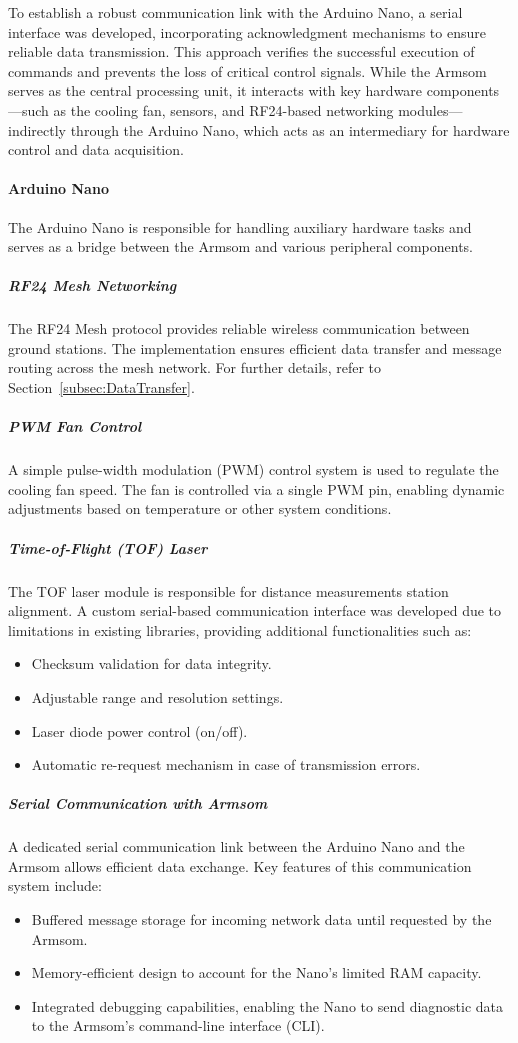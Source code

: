 To establish a robust communication link with the Arduino Nano, a serial interface was developed, incorporating acknowledgment mechanisms to ensure reliable data transmission. This approach verifies the successful execution of commands and prevents the loss of critical control signals. While the Armsom serves as the central processing unit, it interacts with key hardware components—such as the cooling fan, sensors, and RF24-based networking modules—indirectly through the Arduino Nano, which acts as an intermediary for hardware control and data acquisition.

\paragraph{Arduino Nano}
The Arduino Nano is responsible for handling auxiliary hardware tasks and serves as a bridge between the Armsom and various peripheral components.

\subparagraph{RF24 Mesh Networking}
The RF24 Mesh protocol provides reliable wireless communication between ground stations. The implementation ensures efficient data transfer and message routing across the mesh network. For further details, refer to Section~\ref{subsec:DataTransfer}.

\subparagraph{PWM Fan Control}
A simple pulse-width modulation (PWM) control system is used to regulate the cooling fan speed. The fan is controlled via a single PWM pin, enabling dynamic adjustments based on temperature or other system conditions.

\subparagraph{Time-of-Flight (TOF) Laser}
The TOF laser module is responsible for distance measurements station alignment. A custom serial-based communication interface was developed due to limitations in existing libraries, providing additional functionalities such as:
\begin{itemize}
	\item Checksum validation for data integrity.
	\item Adjustable range and resolution settings.
	\item Laser diode power control (on/off).
	\item Automatic re-request mechanism in case of transmission errors.
\end{itemize}

\subparagraph{Serial Communication with Armsom}
A dedicated serial communication link between the Arduino Nano and the Armsom allows efficient data exchange. Key features of this communication system include:
\begin{itemize}
	\item Buffered message storage for incoming network data until requested by the Armsom.
	\item Memory-efficient design to account for the Nano’s limited RAM capacity.
	\item Integrated debugging capabilities, enabling the Nano to send diagnostic data to the Armsom’s command-line interface (CLI).
\end{itemize}

